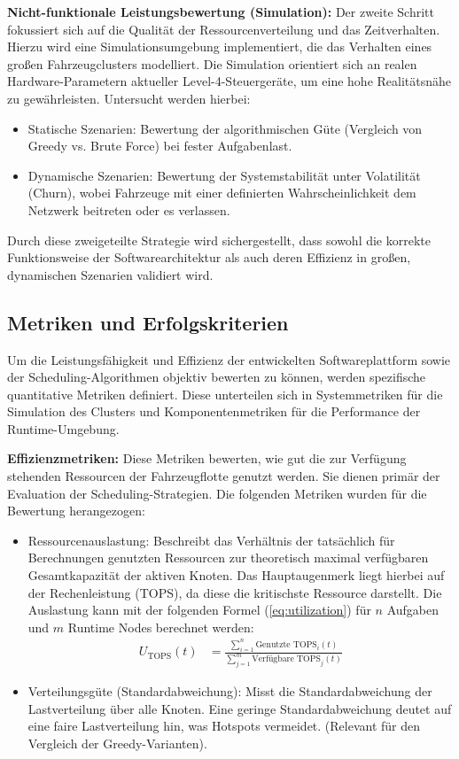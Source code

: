 \textbf{Nicht-funktionale Leistungsbewertung (Simulation):} Der zweite Schritt fokussiert sich auf die Qualität der Ressourcenverteilung und das Zeitverhalten. Hierzu wird eine Simulationsumgebung implementiert, die das Verhalten eines großen Fahrzeugclusters modelliert. Die Simulation orientiert sich an realen Hardware-Parametern aktueller Level-4-Steuergeräte, um eine hohe Realitätsnähe zu gewährleisten. Untersucht werden hierbei:

\begin{itemize}
    \item Statische Szenarien: Bewertung der algorithmischen Güte (Vergleich von Greedy vs. Brute Force) bei fester Aufgabenlast.
    \item Dynamische Szenarien: Bewertung der Systemstabilität unter Volatilität (Churn), wobei Fahrzeuge mit einer definierten Wahrscheinlichkeit dem Netzwerk beitreten oder es verlassen.
\end{itemize}

Durch diese zweigeteilte Strategie wird sichergestellt, dass sowohl die korrekte Funktionsweise der Softwarearchitektur als auch deren Effizienz in großen, dynamischen Szenarien validiert wird.

\subsection{Metriken und Erfolgskriterien}
\label{sec:MetrikenundErfolgskriterien}

Um die Leistungsfähigkeit und Effizienz der entwickelten Softwareplattform sowie der Scheduling-Algorithmen objektiv bewerten zu können, werden spezifische quantitative Metriken definiert. Diese unterteilen sich in Systemmetriken für die Simulation des Clusters und Komponentenmetriken für die Performance der Runtime-Umgebung.

\textbf{Effizienzmetriken:} Diese Metriken bewerten, wie gut die zur Verfügung stehenden Ressourcen der Fahrzeugflotte genutzt werden. Sie dienen primär der Evaluation der Scheduling-Strategien. Die folgenden Metriken wurden für die Bewertung herangezogen:

\begin{itemize}
    \item Ressourcenauslastung: Beschreibt das Verhältnis der tatsächlich für Berechnungen genutzten Ressourcen zur theoretisch maximal verfügbaren Gesamtkapazität der aktiven Knoten. Das Hauptaugenmerk liegt hierbei auf der Rechenleistung (TOPS), da diese die kritischste Ressource darstellt. Die Auslastung kann mit der folgenden Formel (\autoref{eq:utilization}) für $n$ Aufgaben und $m$ Runtime Nodes berechnet werden:
    \begin{align}
    U_{\text{TOPS}}(t) &= \frac{\sum_{i=1}^{n} \text{Genutzte TOPS}_i(t)}{\sum_{j=1}^{m} \text{Verfügbare TOPS}_j(t)}
    \label{eq:utilization}
    \end{align}
    \item Verteilungsgüte (Standardabweichung): Misst die Standardabweichung der Lastverteilung über alle Knoten. Eine geringe Standardabweichung deutet auf eine faire Lastverteilung hin, was Hotspots vermeidet. (Relevant für den Vergleich der Greedy-Varianten).
\end{itemize} 

